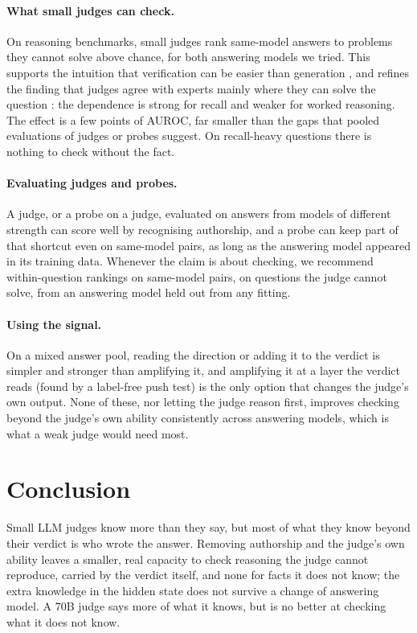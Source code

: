 \documentclass[11pt]{article}
\begin{document}
\paragraph{What small judges can check.} On reasoning benchmarks, small judges rank same-model answers to problems they cannot solve above chance, for both answering models we tried. This supports the intuition that verification can be easier than generation \citep{cobbe2021training,song2025mind}, and refines the finding that judges agree with experts mainly where they can solve the question \citep{krumdick2026nofreelabels,tan2025judgebench}: the dependence is strong for recall and weaker for worked reasoning. The effect is a few points of AUROC, far smaller than the gaps that pooled evaluations of judges or probes suggest. On recall-heavy questions there is nothing to check without the fact.

\paragraph{Evaluating judges and probes.} A judge, or a probe on a judge, evaluated on answers from models of different strength can score well by recognising authorship, and a probe can keep part of that shortcut even on same-model pairs, as long as the answering model appeared in its training data. Whenever the claim is about checking, we recommend within-question rankings on same-model pairs, on questions the judge cannot solve, from an answering model held out from any fitting.

\paragraph{Using the signal.} On a mixed answer pool, reading the direction or adding it to the verdict is simpler and stronger than amplifying it, and amplifying it at a layer the verdict reads (found by a label-free push test) is the only option that changes the judge's own output. None of these, nor letting the judge reason first, improves checking beyond the judge's own ability consistently across answering models, which is what a weak judge would need most.

\section{Conclusion}

Small LLM judges know more than they say, but most of what they know beyond their verdict is who wrote the answer. Removing authorship and the judge's own ability leaves a smaller, real capacity to check reasoning the judge cannot reproduce, carried by the verdict itself, and none for facts it does not know; the extra knowledge in the hidden state does not survive a change of answering model. A 70B judge says more of what it knows, but is no better at checking what it does not know.
\end{document}
